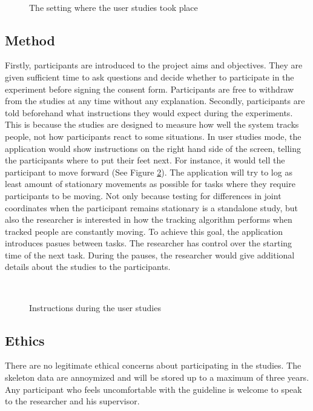 \documentclass{sigchi}
\begin{document}
\begin{figure}[!h]
  \centering
  
  \caption{The setting where the user studies took place}~\label{fig:studies_setting}
\end{figure}

\subsection{Method}

Firstly, participants are introduced to the project aims and objectives. They are given sufficient time to ask questions and decide whether to participate in the experiment before signing the consent form. Participants are free to withdraw from the studies at any time without any explanation. Secondly, participants are told beforehand what instructions they would expect during the experiments. This is because the studies are designed to measure how well the system tracks people, not how participants react to some situations. In user studies mode, the application would show instructions on the right hand side of the screen, telling the participants where to put their feet next. For instance, it would tell the participant to move forward (See Figure \ref{fig:studies_instruction}). The application will try to log as least amount of stationary movements as possible for tasks where they require participants to be moving. Not only because testing for differences in joint coordinates when the participant remains stationary is a standalone study, but also the researcher is interested in how the tracking algorithm performs when tracked people are constantly moving. To achieve this goal, the application introduces pasues between tasks. The researcher has control over the starting time of the next task. During the pauses, the researcher would give additional details about the studies to the participants.

\begin{figure}[!h]
  \centering
  
  \caption{Instructions during the user studies}~\label{fig:studies_instruction}
\end{figure}

\subsection{Ethics}

There are no legitimate ethical concerns about participating in the studies. The skeleton data are annoymized and will be stored up to a maximum of three years. Any participant who feels uncomfortable with the guideline is welcome to speak to the researcher and his supervisor.
\end{document}
